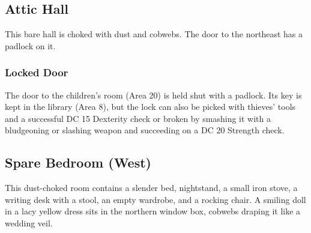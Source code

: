 \pagebreak
\subsection{Attic Hall}
\label{sec:AtticHall}
\begin{readout}
  This bare hall is choked with dust and cobwebs. The door to the northeast has a padlock on it.
\end{readout}

\subsubsection*{Locked Door}
The door to the children's room (Area 20) is held shut with a padlock. Its key is kept in the library (Area 8),
but the lock can also be picked with thieves' tools and a successful DC 15 Dexterity check or broken by smashing
it with a bludgeoning or slashing weapon and succeeding on a DC 20 Strength check.

\begin{arealinks}
\end{arealinks}


\pagebreak
\subsection{Spare Bedroom (West)}
\label{sec:SpareBedroomWest}
\begin{readout}
  This dust-choked room contains a slender bed, nightstand, a small iron stove, a writing desk with a stool,
  an empty wardrobe, and a rocking chair. A smiling doll in a lacy yellow dress sits in the northern window
  box, cobwebs draping it like a wedding veil.
\end{readout}

\begin{arealinks}
\end{arealinks}


\pagebreak
